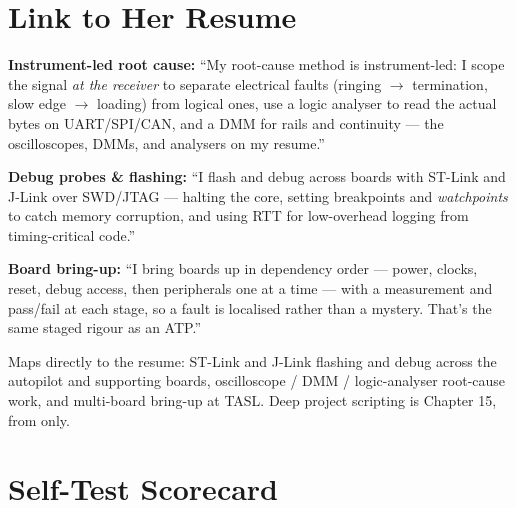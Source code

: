\section{Link to Her Resume}

\begin{resumelink}
\textbf{Instrument-led root cause:} ``My root-cause method is instrument-led: I
scope the signal \emph{at the receiver} to separate electrical faults
(ringing $\rightarrow$ termination, slow edge $\rightarrow$ loading) from
logical ones, use a logic analyser to read the actual bytes on UART/SPI/CAN, and
a DMM for rails and continuity --- the oscilloscopes, DMMs, and analysers on my
resume.''

\medskip
\textbf{Debug probes \& flashing:} ``I flash and debug across boards with
ST-Link and J-Link over SWD/JTAG --- halting the core, setting breakpoints and
\emph{watchpoints} to catch memory corruption, and using RTT for low-overhead
logging from timing-critical code.''

\medskip
\textbf{Board bring-up:} ``I bring boards up in dependency order --- power,
clocks, reset, debug access, then peripherals one at a time --- with a
measurement and pass/fail at each stage, so a fault is localised rather than a
mystery. That's the same staged rigour as an ATP.''

\medskip
\small Maps directly to the resume: ST-Link and J-Link flashing and debug
across the autopilot and supporting boards, oscilloscope / DMM / logic-analyser
root-cause work, and multi-board bring-up at TASL. Deep project scripting is
Chapter 15, from  only.
\end{resumelink}

\section{Self-Test Scorecard}

